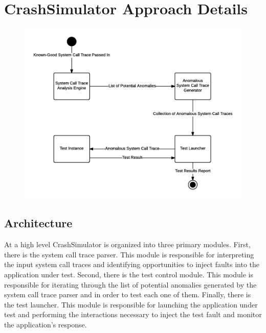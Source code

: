 
\section{CrashSimulator Approach Details}

    \begin{figure}[h]
        \center{}
        \includegraphics[scale=.5]{Architecture}
    \end{figure}

    \subsection{Architecture}

        At a high level CrashSimulator is organized into three primary modules. First, there is the system call trace
        parser. This module is responsible for interpreting the input system call traces and identifying opportunities
        to inject faults into the application under test. Second, there is the test control module. This module is
        responsible for iterating through the list of potential anomalies generated by the system call trace parser and
        in order to test each one of them. Finally, there is the test launcher. This module is responsible for launching
        the application under test and performing the interactions necessary to inject the test fault and monitor the
        application's response.

